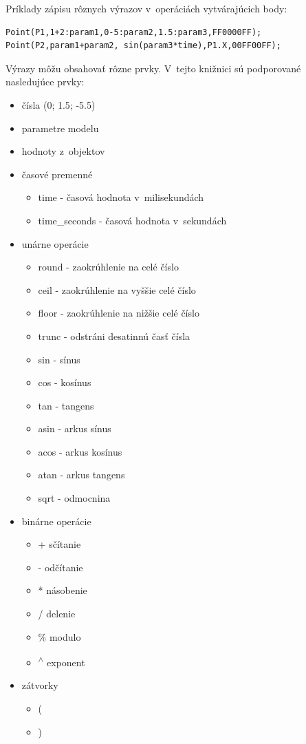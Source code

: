 \pagebreak
Príklady zápisu rôznych výrazov v~operáciách vytvárajúcich body:\nopagebreak
\lstset {language=C++}
\begin{lstlisting}
Point(P1,1+2:param1,0-5:param2,1.5:param3,FF0000FF);
Point(P2,param1+param2, sin(param3*time),P1.X,00FF00FF); 
\end{lstlisting}

Výrazy môžu obsahovať rôzne prvky. V~tejto knižnici sú podporované nasledujúce prvky: 
\begin{itemize}
    \item  čísla (0; 1.5; -5.5)
    \item  parametre modelu
    \item  hodnoty z~objektov
    \item  časové premenné
        \begin{itemize}
            \item  time - časová hodnota v~milisekundách
            \item  time\_seconds - časová hodnota v~sekundách
         \end{itemize}
    \item  unárne operácie
        \begin{itemize}
            \item  round - zaokrúhlenie na celé číslo
            \item  ceil - zaokrúhlenie na vyššie celé číslo
            \item  floor  - zaokrúhlenie na nižšie celé číslo
            \item  trunc  - odstráni desatinnú časť čísla
            \item  sin - sínus
            \item  cos - kosínus
            \item  tan - tangens
            \item  asin - arkus sínus 
            \item  acos - arkus kosínus
            \item  atan - arkus tangens
            \item  sqrt - odmocnina
         \end{itemize}
    \item  binárne operácie
        \begin{itemize}
            \item + sčítanie
            \item - odčítanie
            \item * násobenie
            \item / delenie
            \item \% modulo
            \item \textsuperscript{$\wedge$} exponent
         \end{itemize}
    \item  zátvorky
        \begin{itemize}
            \item  (
            \item  )
         \end{itemize}
 \end{itemize}
 


